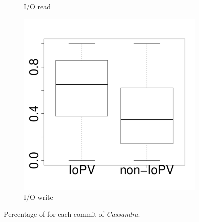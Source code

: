 \begin{figure}[t]
\begin{subfigure}{0.19\textwidth}
                \caption{I/O read}
        \end{subfigure}
        \begin{subfigure}{0.19\textwidth}
                \includegraphics[width=\linewidth]{Figures/iowrite-cassandra-boxplot.pdf}
                \caption{I/O write}
        \end{subfigure}
        
	\caption{Percentage of \inconsistent for each commit of \emph{Cassandra}.}
	\label{fig:iopv_per_commit_cassandra}
\end{figure}


